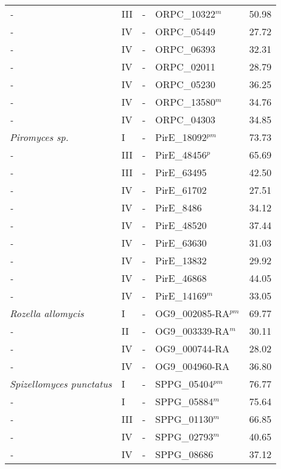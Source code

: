 {{\begin{longtable}{llllr}
  \emph{-} & III & - & ORPC\_10322$^{m}$ & 50.98 \\ 
  \emph{-} & IV & - & ORPC\_05449 & 27.72 \\ 
  \emph{-} & IV & - & ORPC\_06393 & 32.31 \\ 
  \emph{-} & IV & - & ORPC\_02011 & 28.79 \\ 
  \emph{-} & IV & - & ORPC\_05230 & 36.25 \\ 
  \emph{-} & IV & - & ORPC\_13580$^{m}$ & 34.76 \\ 
  \emph{-} & IV & - & ORPC\_04303 & 34.85 \\ 
  \emph{Piromyces sp. } & I & - & PirE\_18092$^{pm}$ & 73.73 \\ 
  \emph{-} & III & - & PirE\_48456$^{p}$ & 65.69 \\ 
  \emph{-} & III & - & PirE\_63495 & 42.50 \\ 
  \emph{-} & IV & - & PirE\_61702 & 27.51 \\ 
  \emph{-} & IV & - & PirE\_8486 & 34.12 \\ 
  \emph{-} & IV & - & PirE\_48520 & 37.44 \\ 
  \emph{-} & IV & - & PirE\_63630 & 31.03 \\ 
  \emph{-} & IV & - & PirE\_13832 & 29.92 \\ 
  \emph{-} & IV & - & PirE\_46868 & 44.05 \\ 
  \emph{-} & IV & - & PirE\_14169$^{m}$ & 33.05 \\ 
  \emph{Rozella allomycis } & I & - & OG9\_002085-RA$^{pm}$ & 69.77 \\ 
  \emph{-} & II & - & OG9\_003339-RA$^{m}$ & 30.11 \\ 
  \emph{-} & IV & - & OG9\_000744-RA & 28.02 \\ 
  \emph{-} & IV & - & OG9\_004960-RA & 36.80 \\ 
  \emph{Spizellomyces punctatus } & I & - & SPPG\_05404$^{pm}$ & 76.77 \\ 
  \emph{-} & I & - & SPPG\_05884$^{m}$ & 75.64 \\ 
  \emph{-} & III & - & SPPG\_01130$^{m}$ & 66.85 \\ 
  \emph{-} & IV & - & SPPG\_02793$^{m}$ & 40.65 \\ 
  \emph{-} & IV & - & SPPG\_08686 & 37.12 \\ 
   \hline
\end{longtable}
} %
} %
